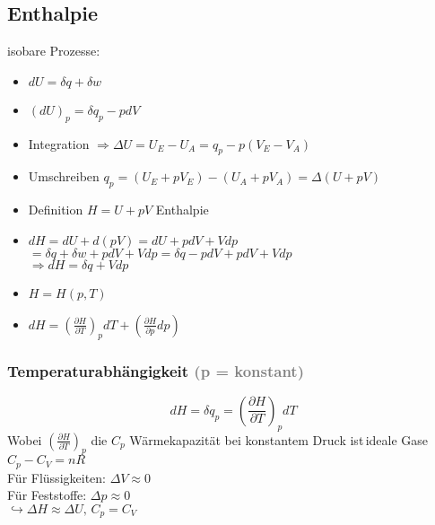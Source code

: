 \documentclass[a4paper, fleqn]{article}
\begin{document}
\subsection{Enthalpie}
isobare Prozesse:
\begin{itemize}
    \item $dU = \delta q + \delta w$
    \item $(dU)_p = \delta q_p - p d V$
    \item Integration $ \Rightarrow \Delta U = U_E - U_A = q_p - p (V_E - V_A)$
    \item Umschreiben $q_p = ( U_E + pV_E ) - ( U_A + pV_A) = \Delta (U+pV)$
    \item Definition $H = U + pV$ Enthalpie
    \item $dH = dU + d(pV) = dU + pdV + Vdp$\\$= \delta q + \delta w + pdV + Vdp = \delta q - pdV + pdV + Vdp$\\$\Rightarrow dH = \delta q + Vdp$
    \item $H = H(p,T)$
    \item $dH = \left(\frac{\partial H}{\partial T}\right)_p dT + \left(\frac{\partial H}{\partial p} dp\right)$
\end{itemize}

\subsubsection{Temperaturabhängigkeit \textcolor{gray}{(p = konstant)}}
\begin{equation*}
    dH = \delta q_p = \left(\frac{\partial H}{\partial T}\right)_p dT
\end{equation*}
Wobei $\left(\frac{\partial H}{\partial T}\right)_p$ die $C_p$ Wärmekapazität bei konstantem Druck ist\,ideale Gase $C_p - C_V = nR$\\
Für Flüssigkeiten: $\Delta V \approx 0$\\
Für Feststoffe: $\Delta p \approx 0$\\
$\hookrightarrow \Delta H \approx \Delta U,\, C_p = C_V$
\end{document}
